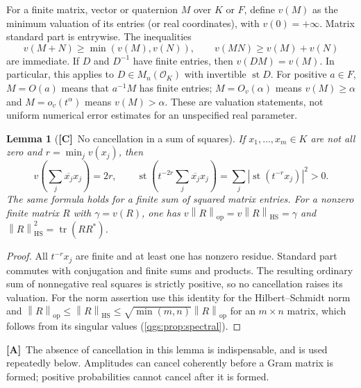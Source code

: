 \documentclass[11pt,oneside]{article}
\numberwithin{equation}{section}
\theoremstyle{plain}
\newtheorem{lemma}[lemma]{Lemma}
\theoremstyle{definition}
\theoremstyle{remark}
\newcommand{\OO}{\mathcal O}
\newcommand{\Oval}[1]{O_{v}(#1)}
\DeclareMathOperator{\st}{st}
\DeclareMathOperator{\tr}{tr}
\newcommand{\op}{\mathrm{op}}
\newcommand{\HS}{\mathrm{HS}}
\newcommand{\abs}[1]{\left|#1\right|}
\newcommand{\norm}[1]{\left\|#1\right\|}
\newcommand{\TC}{\textcolor{TierC}{\textsf{\bfseries[C]}}}
\newcommand{\TA}{\textcolor{TierA}{\textsf{\bfseries[A]}}}
\begin{document}
For a finite matrix, vector or quaternion $M$ over $K$ or $F$, define $v(M)$ as the minimum valuation of its entries (or real coordinates), with $v(0)=+\infty$. Matrix standard part is entrywise. The inequalities
\begin{equation}\label{qgs:eq:matrixval}
 v(M+N)\ge\min(v(M),v(N)),\qquad v(MN)\ge v(M)+v(N)
\end{equation}
are immediate. If $D$ and $D^{-1}$ have finite entries, then $v(DM)=v(M)$. In particular, this applies to $D\in M_n(\OO_K)$ with invertible $\st D$. For positive $a\in F$, $M=O(a)$ means that $a^{-1}M$ has finite entries; $M=\Oval{\alpha}$ means $v(M)\ge\alpha$ and $M=o_v(t^\alpha)$ means $v(M)>\alpha$. These are valuation statements, not uniform numerical error estimates for an unspecified real parameter.

\begin{lemma}[\TC\ No cancellation in a sum of squares]\label{qgs:lem:squares}
If $x_1,\ldots,x_m\in K$ are not all zero and $r=\min_jv(x_j)$, then
\[
 v\!\left(\sum_j\overline{x_j}x_j\right)=2r,
 \qquad
 \st\!\left(t^{-2r}\sum_j\overline{x_j}x_j\right)
 =\sum_j\abs{\st(t^{-r}x_j)}^2>0.
\]
The same formula holds for a finite sum of squared matrix entries. For a nonzero finite matrix $R$ with $\gamma=v(R)$, one has $v\norm R_\op=v\norm R_\HS=\gamma$ and $\norm R_\HS^2=\tr(RR^*)$.
\end{lemma}
\begin{proof}
All $t^{-r}x_j$ are finite and at least one has nonzero residue. Standard part commutes with conjugation and finite sums and products. The resulting ordinary sum of nonnegative real squares is strictly positive, so no cancellation raises its valuation. For the norm assertion use this identity for the Hilbert--Schmidt norm and $\norm R_\op\le\norm R_\HS\le\sqrt{\min(m,n)}\norm R_\op$ for an $m\times n$ matrix, which follows from its singular values (\cref{qgs:prop:spectral}).
\end{proof}

\TA\ The absence of cancellation in this lemma is indispensable, and is used repeatedly below. Amplitudes can cancel coherently before a Gram matrix is formed; positive probabilities cannot cancel after it is formed.
\end{document}
